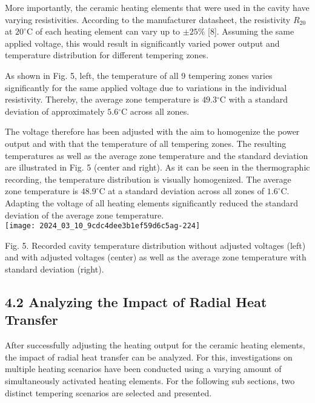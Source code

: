 \documentclass[10pt]{article}
\begin{document}
More importantly, the ceramic heating elements that were used in the cavity have varying resistivities. According to the manufacturer datasheet, the resistivity $R_{20}$ at $20^{\circ} \mathrm{C}$ of each heating element can vary up to $\pm 25 \%$ [8]. Assuming the same applied voltage, this would result in significantly varied power output and temperature distribution for different tempering zones.

As shown in Fig. 5, left, the temperature of all 9 tempering zones varies significantly for the same applied voltage due to variations in the individual resistivity. Thereby, the average zone temperature is $49.3{ }^{\circ} \mathrm{C}$ with a standard deviation of approximately $5.6{ }^{\circ} \mathrm{C}$ across all zones.

The voltage therefore has been adjusted with the aim to homogenize the power output and with that the temperature of all tempering zones. The resulting temperatures as well as the average zone temperature and the standard deviation are illustrated in Fig. 5 (center and right). As it can be seen in the thermographic recording, the temperature distribution is visually homogenized. The average zone temperature is $48.9^{\circ} \mathrm{C}$ at a standard deviation across all zones of $1.6^{\circ} \mathrm{C}$. Adapting the voltage of all heating elements significantly reduced the standard deviation of the average zone temperature.\\
\texttt{[image: 2024\_03\_10\_9cdc4dee3b1ef59d6c5ag-224]}

Fig. 5. Recorded cavity temperature distribution without adjusted voltages (left) and with adjusted voltages (center) as well as the average zone temperature with standard deviation (right).

\subsection*{4.2 Analyzing the Impact of Radial Heat Transfer}
After successfully adjusting the heating output for the ceramic heating elements, the impact of radial heat transfer can be analyzed. For this, investigations on multiple heating scenarios have been conducted using a varying amount of simultaneously activated heating elements. For the following sub sections, two distinct tempering scenarios are selected and presented.
\end{document}
